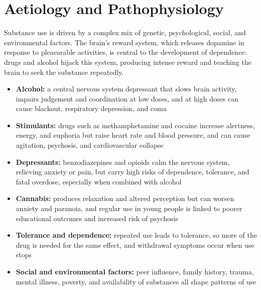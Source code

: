 \section*{Aetiology and Pathophysiology}
Substance use is driven by a complex mix of genetic, psychological, social, and environmental factors. The brain's reward system, which releases dopamine in response to pleasurable activities, is central to the development of dependence: drugs and alcohol hijack this system, producing intense reward and teaching the brain to seek the substance repeatedly.
\begin{itemize}
    \item \textbf{Alcohol:} a central nervous system depressant that slows brain activity, impairs judgement and coordination at low doses, and at high doses can cause blackout, respiratory depression, and coma
    \item \textbf{Stimulants:} drugs such as methamphetamine and cocaine increase alertness, energy, and euphoria but raise heart rate and blood pressure, and can cause agitation, psychosis, and cardiovascular collapse
    \item \textbf{Depressants:} benzodiazepines and opioids calm the nervous system, relieving anxiety or pain, but carry high risks of dependence, tolerance, and fatal overdose, especially when combined with alcohol
    \item \textbf{Cannabis:} produces relaxation and altered perception but can worsen anxiety and paranoia, and regular use in young people is linked to poorer educational outcomes and increased risk of psychosis
    \item \textbf{Tolerance and dependence:} repeated use leads to tolerance, so more of the drug is needed for the same effect, and withdrawal symptoms occur when use stops
    \item \textbf{Social and environmental factors:} peer influence, family history, trauma, mental illness, poverty, and availability of substances all shape patterns of use
\end{itemize}

